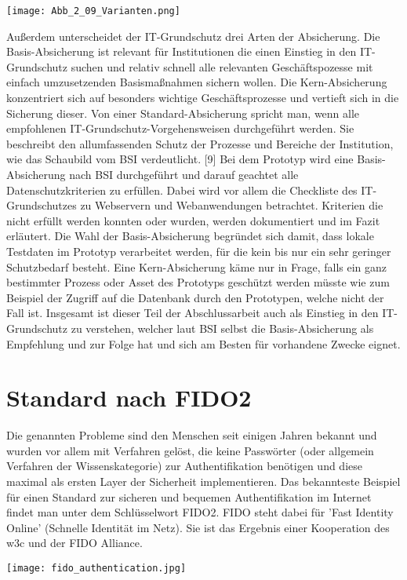 \texttt{[image: Abb\_2\_09\_Varianten.png]}

Außerdem unterscheidet der IT-Grundschutz drei Arten der Absicherung. Die Basis-Absicherung ist relevant für Institutionen die einen Einstieg in den IT-Grundschutz suchen und relativ schnell alle relevanten Geschäftspozesse mit einfach umzusetzenden Basismaßnahmen sichern wollen. Die Kern-Absicherung konzentriert sich auf besonders wichtige Geschäftsprozesse und vertieft sich in die Sicherung dieser. Von einer Standard-Absicherung spricht man, wenn alle empfohlenen IT-Grundschutz-Vorgehensweisen durchgeführt werden. Sie beschreibt den allumfassenden Schutz der Prozesse und Bereiche der Institution, wie das Schaubild vom BSI verdeutlicht. [9] Bei dem Prototyp wird eine Basis-Absicherung nach BSI durchgeführt und darauf geachtet alle Datenschutzkriterien zu erfüllen. Dabei wird vor allem die Checkliste des IT-Grundschutzes zu Webservern und Webanwendungen betrachtet. Kriterien die nicht erfüllt werden konnten oder wurden, werden dokumentiert und im Fazit erläutert. Die Wahl der Basis-Absicherung begründet sich damit, dass lokale Testdaten im Prototyp verarbeitet werden, für die kein bis nur ein sehr geringer Schutzbedarf besteht. Eine Kern-Absicherung käme nur in Frage, falls ein ganz bestimmter Prozess oder Asset des Prototyps geschützt werden müsste wie zum Beispiel der Zugriff auf die Datenbank durch den Prototypen, welche nicht der Fall ist. Insgesamt ist dieser Teil der Abschlussarbeit auch als Einstieg in den IT-Grundschutz zu verstehen, welcher laut BSI selbst die Basis-Absicherung als Empfehlung und zur Folge hat und sich am Besten für vorhandene Zwecke eignet.

\section{Standard nach FIDO2}
Die genannten Probleme sind den Menschen seit einigen Jahren bekannt und wurden vor allem mit Verfahren gelöst, die keine Passwörter (oder allgemein Verfahren der Wissenskategorie) zur Authentifikation benötigen und diese maximal als ersten Layer der Sicherheit implementieren. Das bekannteste Beispiel für einen Standard zur sicheren und bequemen Authentifikation im Internet findet man unter dem Schlüsselwort FIDO2. FIDO steht dabei für 'Fast Identity Online' (Schnelle Identität im Netz). Sie ist das Ergebnis einer Kooperation des \ac{w3c} und der FIDO Alliance.

\texttt{[image: fido\_authentication.jpg]}


